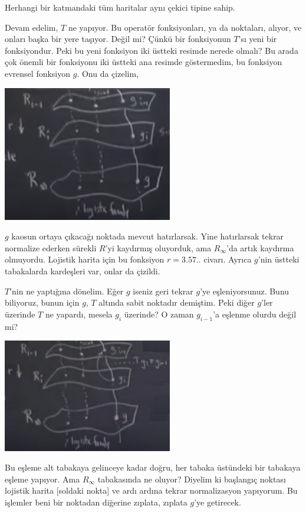 \documentclass[12pt,fleqn]{article}\usepackage{../../common}
\begin{document}
Herhangi bir katmandaki tüm haritalar aynı çekici tipine sahip.

Devam edelim, $T$ ne yapıyor. Bu operatör fonksiyonları, ya da noktaları,
alıyor, ve onları başka bir yere taşıyor. Değil mi? Çünkü bir fonksiyonun $T$'sı
yeni bir fonksiyondur. Peki bu yeni fonksiyon iki üstteki resimde nerede olmalı?
Bu arada çok önemli bir fonksiyonu iki üstteki ana resimde göstermedim, bu
fonksiyon evrensel fonksiyon $g$. Onu da çizelim,

\includegraphics[width=20em]{22_06.png}

$g$ kaosun ortaya çıkacağı noktada mevcut hatırlarsak.  Yine hatırlarsak tekrar
normalize ederken sürekli $R$'yi kaydırmış oluyorduk, ama $R_\infty$'da artık
kaydırma olmuyordu. Lojistik harita için bu fonksiyon $r=3.57..$ civarı. Ayrıca
$g$'nin üstteki tabakalarda kardeşleri var, onlar da çizildi. 

$T$'nin ne yaptığına dönelim. Eğer $g$ iseniz geri tekrar $g$'ye
eşleniyorsunuz. Bunu biliyoruz, bunun için $g$, $T$ altında sabit noktadır
demiştim. Peki diğer $g$'ler üzerinde $T$ ne yapardı, mesela $g_{i}$ üzerinde?
O zaman $g_{i-1}$'a eşlenme olurdu değil mi?

\includegraphics[width=20em]{22_07.png}

Bu eşleme alt tabakaya gelinceye kadar doğru, her tabaka üstündeki bir tabakaya
eşleme yapıyor. Ama $R_\infty$ tabakasında ne oluyor? Diyelim ki başlangıç
noktası lojistik harita [soldaki nokta] ve ardı ardına tekrar normalizasyon
yapıyorum. Bu işlemler beni bir noktadan diğerine zıplata, zıplata $g$'ye
getirecek.
\end{document}
